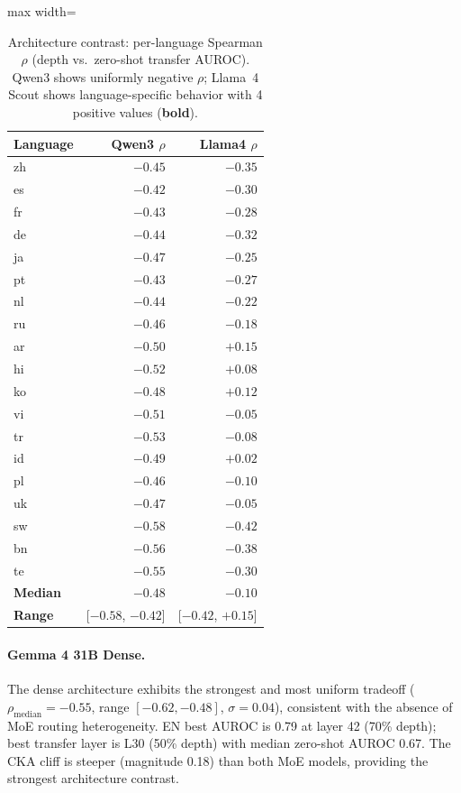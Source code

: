 \documentclass[11pt,a4paper]{article}
\begin{document}
\begin{table}[t]
\centering
\small
\begin{adjustbox}{max width=\columnwidth}
\begin{tabular}{lrr}
\toprule
\textbf{Language} & \textbf{Qwen3 $\rho$} & \textbf{Llama4 $\rho$} \\
\midrule
zh & $-0.45$ & $-0.35$ \\
es & $-0.42$ & $-0.30$ \\
fr & $-0.43$ & $-0.28$ \\
de & $-0.44$ & $-0.32$ \\
ja & $-0.47$ & $-0.25$ \\
pt & $-0.43$ & $-0.27$ \\
nl & $-0.44$ & $-0.22$ \\
ru & $-0.46$ & $-0.18$ \\
\midrule
ar & $-0.50$ & $\mathbf{+0.15}$ \\
hi & $-0.52$ & $\mathbf{+0.08}$ \\
ko & $-0.48$ & $\mathbf{+0.12}$ \\
vi & $-0.51$ & $-0.05$ \\
tr & $-0.53$ & $-0.08$ \\
id & $-0.49$ & $\mathbf{+0.02}$ \\
pl & $-0.46$ & $-0.10$ \\
uk & $-0.47$ & $-0.05$ \\
\midrule
sw & $-0.58$ & $-0.42$ \\
bn & $-0.56$ & $-0.38$ \\
te & $-0.55$ & $-0.30$ \\
\midrule
\textbf{Median} & $-0.48$ & $-0.10$ \\
\textbf{Range} & [$-0.58$, $-0.42$] & [$-0.42$, $+0.15$] \\
\bottomrule
\end{tabular}
\end{adjustbox}
\caption{Architecture contrast: per-language Spearman $\rho$ (depth vs.\ zero-shot transfer AUROC). Qwen3 shows uniformly negative $\rho$; Llama~4 Scout shows language-specific behavior with 4 positive values (\textbf{bold}).}
\label{tab:arch_contrast}
\end{table}

\paragraph{Gemma 4 31B Dense.}
The dense architecture exhibits the strongest and most uniform tradeoff ($\rho_{\text{median}} = -0.55$, range $[-0.62, -0.48]$, $\sigma = 0.04$), consistent with the absence of MoE routing heterogeneity.
EN best AUROC is 0.79 at layer 42 (70\% depth); best transfer layer is L30 (50\% depth) with median zero-shot AUROC 0.67.
The CKA cliff is steeper (magnitude 0.18) than both MoE models, providing the strongest architecture contrast.
\end{document}
